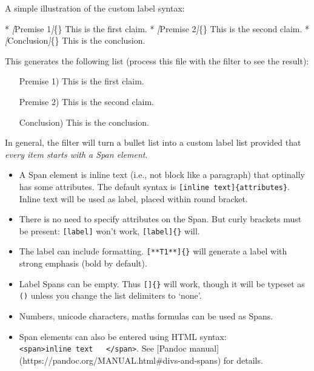 \documentclass[
]{article}
\newenvironment{Shaded}{}{}
\newcommand{\CommentTok}[1]{\textcolor[rgb]{0.38,0.63,0.69}{\textit{#1}}}
\newcommand{\NormalTok}[1]{#1}
\newcommand{\OtherTok}[1]{\textcolor[rgb]{0.00,0.44,0.13}{#1}}
\newcommand{\SpecialStringTok}[1]{\textcolor[rgb]{0.73,0.40,0.53}{#1}}
\providecommand{\tightlist}{%
  \setlength{\itemsep}{0pt}\setlength{\parskip}{0pt}}
\begin{document}
A simple illustration of the custom label syntax:

\begin{Shaded}
\begin{Highlighting}[]
\SpecialStringTok{* }\CommentTok{[}\OtherTok{Premise 1}\CommentTok{]}\NormalTok{\{\} This is the first claim.}
\SpecialStringTok{* }\CommentTok{[}\OtherTok{Premise 2}\CommentTok{]}\NormalTok{\{\} This is the second claim.}
\SpecialStringTok{* }\CommentTok{[}\OtherTok{Conclusion}\CommentTok{]}\NormalTok{\{\} This is the conclusion.}
\end{Highlighting}
\end{Shaded}

This generates the following list (process this file with the filter to
see the result):

\begin{itemize}
\tightlist

\item[Premise 1)] This is the first claim.

\item[Premise 2)] This is the second claim.

\item[Conclusion)] This is the conclusion.

\end{itemize}

In general, the filter will turn a bullet list into a custom label list
provided that \emph{every item starts with a Span element}.

\begin{itemize}
\tightlist
\item
  A Span element is inline text (i.e., not block like a paragraph) that
  optinally has some attributes. The default syntax is
  \texttt{{[}inline\ text{]}\{attributes\}}. Inline text will be used as
  label, placed within round bracket.
\item
  There is no need to specify attributes on the Span. But curly brackets
  must be present: \texttt{{[}label{]}} won't work,
  \texttt{{[}label{]}\{\}} will.
\item
  The label can include formatting. \texttt{{[}**T1**{]}\{\}} will
  generate a label with strong emphasis (bold by default).
\item
  Label Spans can be empty. Thus \texttt{{[}{]}\{\}} will work, though
  it will be typeset as \texttt{()} unless you change the list
  delimiters to `none'.
\item
  Numbers, unicode characters, maths formulas can be used as Spans.
\item
  Span elements can also be entered using HTML syntax:
  \texttt{\textless{}span\textgreater{}inline\ text\ \ \ \textless{}/span\textgreater{}}.
  See {[}Pandoc manual{]}
  (https://pandoc.org/MANUAL.html\#divs-and-spans) for details.
\end{itemize}
\end{document}
